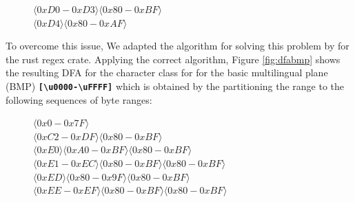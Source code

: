 \begin{figure}[H]
\centering
$\langle0xD0-0xD3\rangle \langle0x80-0xBF\rangle$\\
$\langle0xD4\rangle \langle0x80-0xAF\rangle$
\end{figure}


To overcome this issue, We adapted the algorithm for solving this problem by \citet{utf8-ranges} for the rust regex crate.
Applying the correct algorithm, Figure \ref{fig:dfabmp} shows the resulting DFA for the character class for for the basic multilingual plane (BMP) \texttt{\textbf{[\textbackslash u{0000}-\textbackslash u{FFFF}]}} which is obtained by the partitioning the range to the following sequences of byte ranges:

\begin{figure}[H]
\centering
$\langle0x0-0x7F\rangle$\\
$\langle0xC2-0xDF\rangle \langle0x80-0xBF\rangle$\\
$\langle0xE0\rangle \langle0xA0-0xBF\rangle \langle0x80-0xBF\rangle$\\
$\langle0xE1-0xEC\rangle \langle0x80-0xBF\rangle \langle0x80-0xBF\rangle$\\
$\langle0xED\rangle \langle0x80-0x9F\rangle \langle0x80-0xBF\rangle$\\
$\langle0xEE-0xEF\rangle \langle0x80-0xBF\rangle \langle0x80-0xBF\rangle$
\end{figure}

